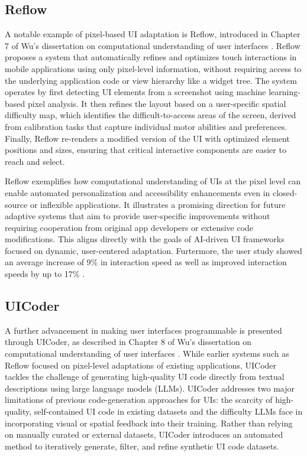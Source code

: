 \documentclass[openany]{book}
\begin{document}
\subsection{Reflow}
 
A notable example of pixel-based UI adaptation is Reflow, introduced in Chapter 7 of Wu's dissertation on computational understanding of user interfaces \cite{Wu2024}. Reflow proposes a system that automatically refines and optimizes touch interactions in mobile applications using only pixel-level information, without requiring access to the underlying application code or view hierarchy like a widget tree.
The system operates by first detecting UI elements from a screenshot using machine learning-based pixel analysis. It then refines the layout based on a user-specific spatial difficulty map, which identifies the difficult-to-access areas of the screen, derived from calibration tasks that capture individual motor abilities and preferences. Finally, Reflow re-renders a modified version of the UI with optimized element positions and sizes, ensuring that critical interactive components are easier to reach and select.

\newpage

Reflow exemplifies how computational understanding of UIs at the pixel level can enable automated personalization and accessibility enhancements even in closed-source or inflexible applications. It illustrates a promising direction for future adaptive systems that aim to provide user-specific improvements without requiring cooperation from original app developers or extensive code modifications. This aligns directly with the goals of AI-driven UI frameworks focused on dynamic, user-centered adaptation. Furtermore, the user study showed an average increase of 9\% in interaction speed as well as improved interaction speeds by up to 17\% \cite{Wu2024}.

\subsection{UICoder}
A further advancement in making user interfaces programmable is presented through UICoder, as described in Chapter 8 of Wu’s dissertation on computational understanding of user interfaces \cite{Wu2024}. While earlier systems such as Reflow focused on pixel-level adaptations of existing applications, UICoder tackles the challenge of generating high-quality UI code directly from textual descriptions using large language models (LLMs).
UICoder addresses two major limitations of previous code-generation approaches for UIs: the scarcity of high-quality, self-contained UI code in existing datasets and the difficulty LLMs face in incorporating visual or spatial feedback into their training. Rather than relying on manually curated or external datasets, UICoder introduces an automated method to iteratively generate, filter, and refine synthetic UI code datasets.
\end{document}
